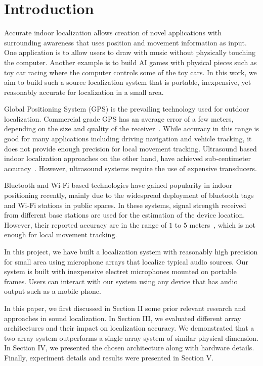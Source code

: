 \chapter{Introduction}

Accurate indoor localization allows creation of novel applications with surrounding awareness that uses position and movement information as input. One application is to allow users to draw with music without physically touching the computer. Another example is to build AI games with physical pieces such as toy car racing where the computer controls some of the toy cars. In this work, we aim to build such a source localization system that is portable, inexpensive, yet reasonably accurate for localization in a small area. 

Global Positioning System (GPS) is the prevailing technology used for outdoor localization. Commercial grade GPS has an average error of a few meters, depending on the size and quality of the receiver~\cite{intro:gps}. While accuracy in this range is good for many applications including driving navigation and vehicle tracking, it does not provide enough precision for local movement tracking. Ultrasound based indoor localization approaches on the other hand, have achieved sub-centimeter accuracy~\cite{intro:ultra}. However, ultrasound systems require the use of expensive transducers.

Bluetooth and Wi-Fi based technologies have gained popularity in indoor positioning recently, mainly due to the widespread deployment of bluetooth tags and Wi-Fi stations in public spaces. In these systems, signal strength received from different base stations are used for the estimation of the device location. However, their reported accuracy are in the range of $1$ to $5$ meters~\cite{intro:blue, intro:loc}, which is not enough for local movement tracking.

In this project, we have built a localization system with reasonably high precision for small area using microphone arrays that localize typical audio sources. Our system is built with inexpensive electret microphones mounted on portable frames. Users can interact with our system using any device that has audio output such as a mobile phone.

In this paper, we first discussed in Section II some prior relevant research and approaches in sound localization. In Section III, we evaluated different array architectures and their impact on localization accuracy. We demonstrated that a two array system outperforms a single array system of similar physical dimension. In Section IV, we presented the chosen architecture along with hardware details. Finally, experiment details and results were presented in Section V.

